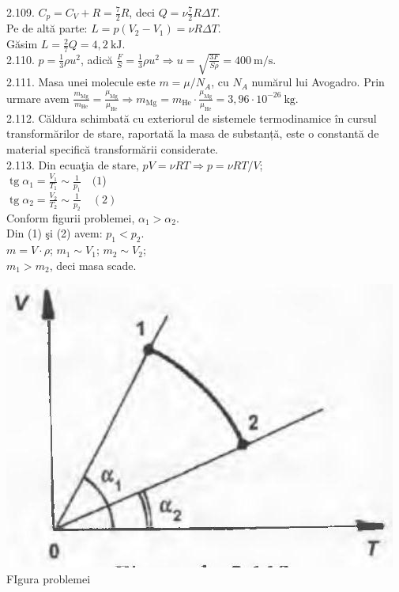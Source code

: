 2.109. $C_{p}=C_{V}+R=\frac{7}{2} R$, deci $Q=\nu \frac{7}{2} R \Delta T$.\\ Pe de altă parte: $L=p\left(V_{2}-V_{1}\right)=\nu R \Delta T$.\\ Găsim $L=\frac{2}{7} Q=4,2 \mathrm{~kJ}$.\\

2.110. $p=\frac{1}{3} \rho u^{2}$, adică $\frac{F}{S}=\frac{1}{3} \rho u^{2} \Rightarrow u=\sqrt{\frac{3 F}{S \rho}}=400 \mathrm{~m} / \mathrm{s}$.\\

2.111. Masa unei molecule este $m=\mu / N_{A}$, cu $N_{A}$ numărul lui Avogadro. Prin urmare avem $\frac{m_{\mathrm{Mg}}}{m_{\mathrm{He}}}=\frac{\mu_{\mathrm{Mg}}}{\mu_{\mathrm{He}}} \Rightarrow m_{\mathrm{Mg}}=m_{\mathrm{He}} \cdot \frac{\mu_{\mathrm{Mg}}}{\mu_{\mathrm{He}}}=3,96 \cdot 10^{-26} \mathrm{~kg}$.\\

2.112. Căldura schimbată cu exteriorul de sistemele termodinamice în cursul transformărilor de stare, raportată la masa de substanță, este o constantă de material specifică transformării considerate.\\

2.113. Din ecuaţia de stare, $p V=\nu R T \Rightarrow p=\nu R T / V$;\\ $\operatorname{tg} \alpha_{1}=\frac{V_{1}}{T_{1}} \sim \frac{1}{p_{1}} \quad (1$)\\ $\operatorname{tg} \alpha_{2}=\frac{V_{2}}{T_{2}} \sim \frac{1}{p_{2}} \quad (2)$\\ Conform figurii problemei, $\alpha_{1}>\alpha_{2}$.\\ Din (1) şi (2) avem: $p_{1}<p_{2}$.\\ $m=V \cdot \rho$; \quad $m_{1} \sim V_{1}$; \quad $m_{2} \sim V_{2}$;\\ $m_{1}>m_{2}$, deci masa scade.\\ \begin{center} \includegraphics[width=0.4\linewidth]{images/2025_07_01_5b3ff9fa0d508c8e9f17g-293(1)}\\ FIgura problemei \end{center}\\

